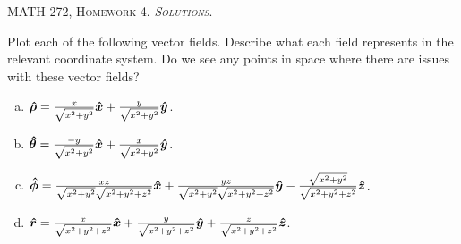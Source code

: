 \documentclass[12pt]{article} %
\newcommand{\rhat}{\boldsymbol{\hat{r}}}
\newcommand{\thetahat}{\boldsymbol{\hat{\theta}}}
\newcommand{\phihat}{\boldsymbol{\hat{\phi}}}
\newcommand{\rhohat}{\boldsymbol{\hat{\rho}}}
\begin{document}
\begin{center}
   \textsc{\large MATH 272, Homework 4. \emph{Solutions}.}\\
\end{center}
\vspace{.5cm}

\begin{problem}
    Plot each of the following vector fields. Describe what each field represents in the relevant coordinate system. Do we see any points in space where there are issues with these vector fields?
    \begin{enumerate}[(a)]
        \item $\rhohat = \frac{x}{\sqrt{x^2+y^2}}\xhat + \frac{y}{\sqrt{x^2+y^2}}\yhat$.
        \item $\thetahat = \frac{-y}{\sqrt{x^2+y^2}}\xhat + \frac{x}{\sqrt{x^2+y^2}}\yhat$.
        \item $\phihat = \frac{xz}{\sqrt{x^2+y^2}\sqrt{x^2+y^2+z^2}}\xhat + \frac{yz}{\sqrt{x^2+y^2}\sqrt{x^2+y^2+z^2}}\yhat-\frac{\sqrt{x^2+y^2}}{\sqrt{x^2+y^2+z^2}}\zhat$.
        \item $\rhat = \frac{x}{\sqrt{x^2+y^2+z^2}}\xhat + \frac{y}{\sqrt{x^2+y^2+z^2}}\yhat+\frac{z}{\sqrt{x^2+y^2+z^2}}\zhat$.
    \end{enumerate}
\end{problem}
\end{document}
